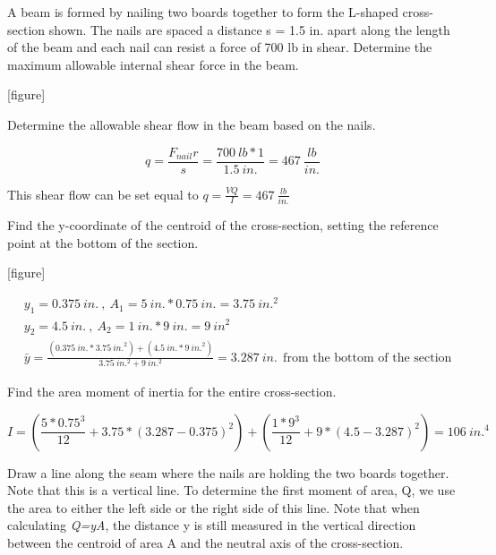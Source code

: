 \documentclass[
  letterpaper,
  DIV=11,
  numbers=noendperiod]{scrreprt}
\begin{document}
\begin{tcolorbox}[enhanced jigsaw, breakable, opacityback=0, toptitle=1mm, left=2mm, colback=white, opacitybacktitle=0.6, colframe=quarto-callout-note-color-frame, titlerule=0mm, arc=.35mm, leftrule=.75mm, bottomtitle=1mm, colbacktitle=quarto-callout-note-color!10!white, rightrule=.15mm, title={Example 10.6}, bottomrule=.15mm, toprule=.15mm, coltitle=black]

A beam is formed by nailing two boards together to form the L-shaped
cross-section shown. The nails are spaced a distance s = 1.5 in. apart
along the length of the beam and each nail can resist a force of 700 lb
in shear. Determine the maximum allowable internal shear force in the
beam.

{[}figure{]}

\begin{tcolorbox}[enhanced jigsaw, breakable, opacityback=0, toptitle=1mm, left=2mm, colback=white, opacitybacktitle=0.6, colframe=quarto-callout-note-color-frame, titlerule=0mm, arc=.35mm, leftrule=.75mm, bottomtitle=1mm, colbacktitle=quarto-callout-note-color!10!white, rightrule=.15mm, title={Solution}, bottomrule=.15mm, toprule=.15mm, coltitle=black]

Determine the allowable shear flow in the beam based on the nails.

\[
q=\frac{F_{nail} r}{s}=\frac{700{~lb} * 1}{1.5{~in.}}=467~\frac{lb}{in.}
\]

This shear flow can be set equal to
\(q=\frac{V Q}{I}=467~\frac{lb}{in.}\)

Find the y-coordinate of the centroid of the cross-section, setting the
reference point at the bottom of the section.

{[}figure{]}

\[
\begin{aligned}
& y_1=0.375{~in.}~,~ A_1=5{~in.} * 0.75{~in.}=3.75{~in.}^2 \\
& y_2=4.5{~in.}~,~ A_2=1{~in.} * 9{~in.}=9{~in}^2 \\
& \bar{y}=\frac{(0.375{~in.} * 3.75{~in.}^2)+(4.5{~in.} * 9{~in.}^2)}{3.75{~in.^2}+9{~in.^2}} = 3.287{~in.}~~\text{from the bottom of the section}
\end{aligned}
\]

Find the area moment of inertia for the entire cross-section.

\[
I=\left(\frac{5 * 0.75^3}{12}+3.75 *(3.287-0.375)^2\right)+\left(\frac{1 * 9^3}{12}+9 *(4.5-3.287)^2\right)=106{~in.}^4
\]

Draw a line along the seam where the nails are holding the two boards
together. Note that this is a vertical line. To determine the first
moment of area, Q, we use the area to either the left side or the right
side of this line. Note that when calculating \emph{Q=yA}, the distance
y is still measured in the vertical direction between the centroid of
area A and the neutral axis of the cross-section.


\end{tcolorbox}
\end{tcolorbox}
\end{document}
